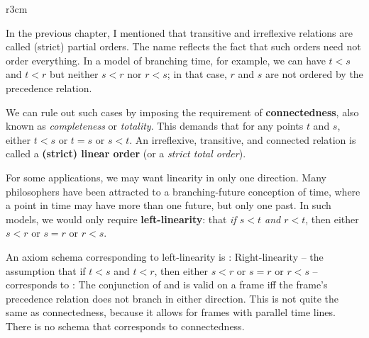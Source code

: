 \begin{wrapfigure}{r}{3cm}
  \quad
\end{wrapfigure}
In the previous chapter, I mentioned that transitive and irreflexive relations
are called (strict) partial orders. The name reflects the fact that such orders
need not order everything. In a model of branching time, for example, we can
have $t<s$ and $t<r$ but neither $s<r$ nor $r<s$; in that case, $r$ and $s$ are
not ordered by the precedence relation.

We can rule out such cases by imposing the requirement of
\textbf{connectedness}, also known as \emph{completeness} or \emph{totality}.
This demands that for any points $t$ and $s$, either $t < s$ or $t=s$ or
$s < t$.  An irreflexive, transitive, and connected relation is called a
\textbf{(strict) linear order} (or a \emph{strict total order}).

For some applications, we may want linearity in only one direction. Many
philosophers have been attracted to a branching-future conception of time,
where a point in time may have more than one future, but only one past. In
such models, we would only require \textbf{left-linearity}: that \emph{if
  $s < t$ and $r < t$}, then either $s < r$ or $s=r$ or $r < s$.

An axiom schema corresponding to left-linearity is :
%
%
Right-linearity -- the assumption that if $t < s$ and $t < r$, then either
$s < r$ or $s=r$ or $r < s$ -- corresponds to :
%
%
%
The conjunction of  and  is valid on a frame iff the frame's
precedence relation does not branch in either direction. This is not quite the
same as connectedness, because it allows for frames with parallel time lines.
There is no schema that corresponds to connectedness.

